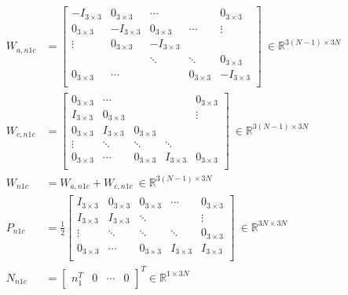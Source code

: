 \documentclass[twoside,12pt]{report} %
\begin{document}
\begin{align}
W_{a,n1c} &= \begin{bmatrix}
    -I_{3\times3} & 0_{3\times3}&  \cdots & & 0_{3\times3} \\
    0_{3\times3}&  -I_{3\times3} & 0_{3\times3}& \cdots & \vdots \\
    \vdots & 0_{3\times3} & -I_{3\times3} & & \\
     &  & \ddots & \ddots & 0_{3\times3} \\
    0_{3\times3} &\cdots & & 0_{3\times3} & -I_{3\times3} \\
\end{bmatrix}~ \in \mathbb{R}^{3(N-1)\times3N} \\
W_{c,n1c} &=\begin{bmatrix}
    0_{3\times3} &   \cdots & & & 0_{3\times3} \\
    I_{3\times3}&  0_{3\times3} &  & & \vdots \\
    0_{3\times3} & I_{3\times3} & 0_{3\times3} &  &  \\
    \vdots & \ddots & \ddots & \ddots & \\
    0_{3\times3} &\cdots & 0_{3\times3} & I_{3\times3} & 0_{3\times3}\\
\end{bmatrix} ~ \in \mathbb{R}^{3(N-1)\times3N} \\
W_{n1c} &=W_{a,n1c} + W_{c,n1c} ~ \in \mathbb{R}^{3(N-1)\times3N} \\
P_{n1c} &= \frac{1}{2} \begin{bmatrix}
    I_{3\times3} & 0_{3\times3}& 0_{3\times3}& \cdots & 0_{3\times3} \\
    I_{3\times3}&  I_{3\times3} & \ddots &  & \vdots \\
    \vdots & \ddots & \ddots & \ddots & 0_{3\times3} \\
    0_{3\times3} &\cdots & 0_{3\times3} & I_{3\times3} & I_{3\times3}\\
\end{bmatrix}~ \in \mathbb{R}^{3N\times3N} \\
N_{n1c} &= \begin{bmatrix} n_1^T & 0 & \cdots & 0 \end{bmatrix}^T \in \mathbb{R}^{1\times3N}
\end{align}
\end{document}

